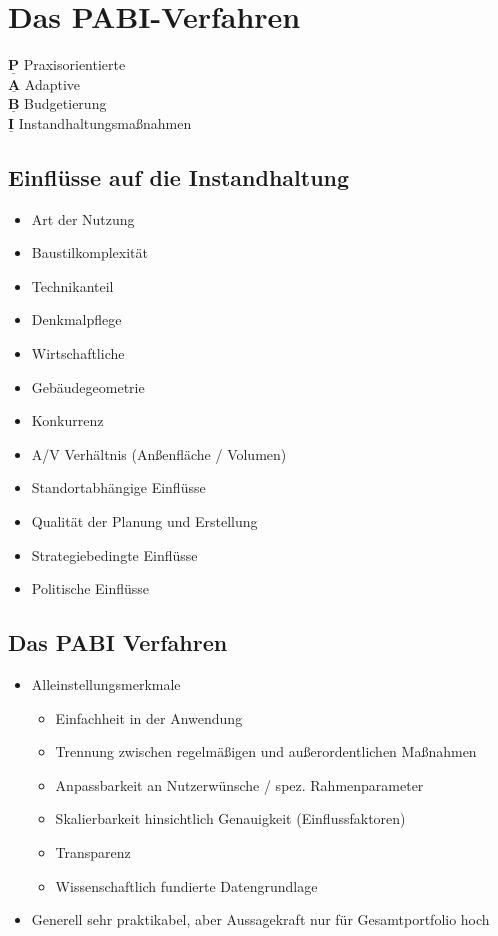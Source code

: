 \documentclass[fleqn,twoside,dvipsnames]{article}
\begin{document}
\section{Das PABI-Verfahren }
        $\underline{\mathbf{P}}$ Praxisorientierte\\
        $\underline{\mathbf{A}}$ Adaptive\\
        $\underline{\mathbf{B}}$ Budgetierung\\
        $\underline{\mathbf{I}}$ Instandhaltungsmaßnahmen
        
    \subsection{Einflüsse auf die Instandhaltung}
        \begin{itemize}
            \item Art der Nutzung
            \item Baustilkomplexität
            \item Technikanteil
            \item Denkmalpflege
            \item Wirtschaftliche
            \item Gebäudegeometrie
            \item Konkurrenz
            \item A/V Verhältnis (Anßenfläche / Volumen)
            \item Standortabhängige Einflüsse
            \item Qualität der Planung und Erstellung
            \item Strategiebedingte Einflüsse
            \item Politische Einflüsse
        \end{itemize}
    \subsection{Das PABI Verfahren}
        \begin{itemize}
            \item Alleinstellungsmerkmale
                \begin{itemize}
                    \item Einfachheit in der Anwendung
                    \item Trennung zwischen regelmäßigen und außerordentlichen Maßnahmen
                    \item Anpassbarkeit an Nutzerwünsche / spez. Rahmenparameter
                    \item Skalierbarkeit hinsichtlich Genauigkeit (Einflussfaktoren)
                    \item Transparenz
                    \item Wissenschaftlich fundierte Datengrundlage
                \end{itemize}
            \item Generell sehr praktikabel, aber Aussagekraft nur für Gesamtportfolio hoch
        \end{itemize}
\end{document}
